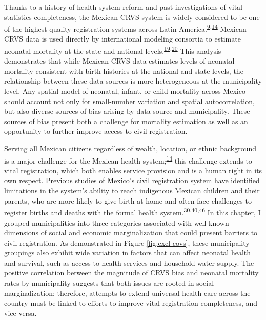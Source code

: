 \documentclass[
]{article}
\begin{document}
Thanks to a history of health system reform and past investigations of vital statistics completeness, the Mexican CRVS system is widely considered to be one of the highest-quality registration systems across Latin America.\textsuperscript{\protect\hyperlink{ref-Mikkelsen2015}{9},\protect\hyperlink{ref-Frenk2006}{14}} Mexican CRVS data is used directly by international modeling consortia to estimate neonatal mortality at the state and national levels.\textsuperscript{\protect\hyperlink{ref-UNInter-agencyGrouponMortalityEstimationUNIGME2020}{19},\protect\hyperlink{ref-Dicker2018}{20}} This analysis demonstrates that while Mexican CRVS data estimates levels of neonatal mortality consistent with birth histories at the national and state levels, the relationship between these data sources is more heterogeneous at the municipality level. Any spatial model of neonatal, infant, or child mortality across Mexico should account not only for small-number variation and spatial autocorrelation, but also diverse sources of bias arising by data source and municipality. These sources of bias present both a challenge for mortality estimation as well as an opportunity to further improve access to civil registration.

Serving all Mexican citizens regardless of wealth, location, or ethnic background is a major challenge for the Mexican health system;\textsuperscript{\protect\hyperlink{ref-Frenk2006}{14}} this challenge extends to vital registration, which both enables service provision and is a human right in its own respect. Previous studies of Mexico's civil registration system have identified limitations in the system's ability to reach indigenous Mexican children and their parents, who are more likely to give birth at home and often face challenges to register births and deaths with the formal health system.\textsuperscript{\protect\hyperlink{ref-Hernandez2012}{30},\protect\hyperlink{ref-Paulino2019}{40},\protect\hyperlink{ref-Luis2014}{46}} In this chapter, I grouped municipalities into three categories associated with well-known dimensions of social and economic marginalization that could present barriers to civil registration. As demonstrated in Figure \ref{fig:excl-covs}, these municipality groupings also exhibit wide variation in factors that can affect neonatal health and survival, such as access to health services and household water supply. The positive correlation between the magnitude of CRVS bias and neonatal mortality rates by municipality suggests that both issues are rooted in social marginalization: therefore, attempts to extend universal health care across the country must be linked to efforts to improve vital registration completeness, and vice versa.
\end{document}
